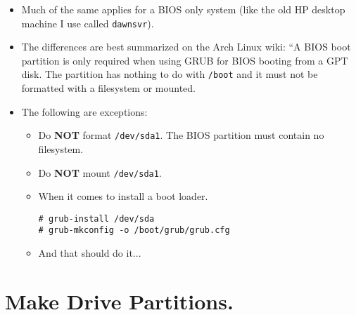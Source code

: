 \documentclass{article}
\begin{document}
\begin{itemize}
  \item Much of the same applies for a BIOS only system (like the old HP desktop machine I use called \verb|dawnsvr|).
  \item The differences are best summarized on the Arch Linux wiki: ``A BIOS boot partition is only required when using GRUB for BIOS booting from a GPT disk.
    The partition has nothing to do with \verb|/boot| and it must not be formatted with a filesystem or mounted.
  \item The following are exceptions:
  \begin{itemize}
    \item Do \textbf{NOT} format \verb|/dev/sda1|. The BIOS partition must contain no filesystem.
    \item Do \textbf{NOT} mount \verb|/dev/sda1|.
    \item When it comes to install a boot loader.
\begin{verbatim}
# grub-install /dev/sda
# grub-mkconfig -o /boot/grub/grub.cfg
\end{verbatim}
    \item And that should do it...
  \end{itemize}
\end{itemize}

\section{Make Drive Partitions.}
\end{document}
